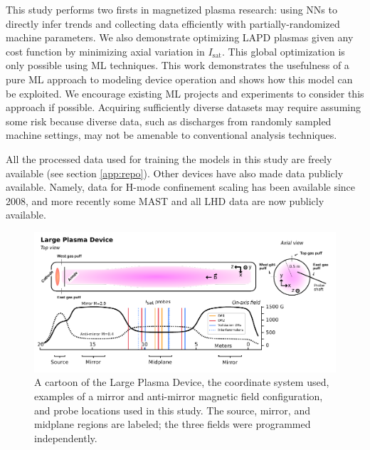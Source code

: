 This study performs two firsts in magnetized plasma research: using NNs to directly infer trends and collecting data efficiently with partially-randomized machine parameters. We also demonstrate optimizing LAPD plasmas given any cost function by minimizing axial variation in $I_\text{sat}$. This global optimization is only possible using ML techniques. This work demonstrates the usefulness of a pure ML approach to modeling device operation and shows how this model can be exploited. We encourage existing ML projects and experiments to consider this approach if possible. Acquiring sufficiently diverse datasets may require assuming some risk because diverse data, such as discharges from randomly sampled machine settings, may not be amenable to conventional analysis techniques.

%
All the processed data used for training the models in this study are freely available\cite{phil_travis_2025_15007853} (see section \ref{app:repo}). Other devices have also made data publicly available. Namely, data for H-mode confinement scaling has been available since 2008\cite{roach_2008_2008}, and more recently some MAST\cite{jackson_fair-mast_2024} and all LHD\cite{lhd_data} data are now publicly available.  


\begin{figure}
	\centering
	\includegraphics[width=\textwidth]{figures/LAPD+coordinates.pdf}
	\caption[Cartoon of the experiment setup]{\label{fig:LAPD_coords}A cartoon of the Large Plasma Device, the coordinate system used, examples of a mirror and anti-mirror magnetic field configuration, and probe locations used in this study. The source, mirror, and midplane regions are labeled; the three fields were programmed independently.}
\end{figure}

